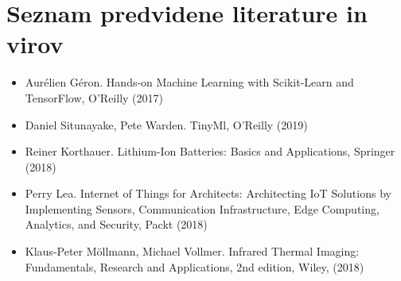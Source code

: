\documentclass[a4paper,12pt]{article}
\begin{document}
\section{ Seznam predvidene literature in virov}

\begin{itemize}
    \item Aurélien Géron. Hands-on Machine Learning with Scikit-Learn and TensorFlow, O’Reilly (2017)
    \item Daniel Situnayake, Pete Warden. TinyMl, O’Reilly (2019)
    \item Reiner Korthauer. Lithium-Ion Batteries: Basics and Applications, Springer (2018)
    \item Perry Lea. Internet of Things for Architects: Architecting IoT Solutions by Implementing Sensors, Communication Infrastructure, Edge Computing, Analytics, and Security, Packt (2018)
    \item Klaus-Peter Möllmann, Michael Vollmer. Infrared Thermal Imaging: Fundamentals, Research and Applications, 2nd edition, Wiley, (2018)
\end{itemize}
\end{document}
